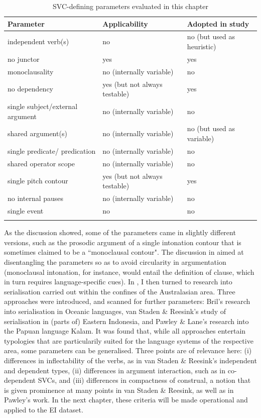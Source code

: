 \begin{table}
    \centering
    \begin{footnotesize}
    \begin{tabular}{l l l}
    \lsptoprule
Parameter & Applicability & Adopted in study \\
\midrule
independent verb(s) & no & no (but used as heuristic) \\
no junctor & yes & yes \\
monoclausality & no (internally variable) & no \\
no dependency & yes (but not always testable) & yes \\
single subject/external argument & no (internally variable) & no \\
shared argument(s) & no (internally variable) & no (but used as variable) \\
single predicate/ predication & no (internally variable) & no \\
shared operator scope & no (internally variable) & no \\
single pitch contour & yes (but not always testable) & yes \\
no internal pauses & no (internally variable) & no \\
single event & no & no \\
\lspbottomrule
    \end{tabular}
    \end{footnotesize}
    \caption{SVC-defining parameters evaluated in this chapter}
    \label{tab:parameters_used}
\end{table}

As the discussion showed, some of the parameters came in slightly different versions, such as the prosodic argument of a single intonation contour that is sometimes claimed to be a ``monoclausal contour". The discussion in  aimed at disentangling the parameters so as to avoid circularity in argumentation (monoclausal intonation, for instance, would entail the definition of clause, which in turn requires language-specific cues). In , I then turned to research into serialisation carried out within the confines of the Australasian area. Three approaches were introduced, and scanned for further parameters: Bril's research into serialisation in Oceanic languages, van Staden \& Reesink's study of serialisation in (parts of) Eastern Indonesia, and Pawley \& Lane's research into the Papuan language Kalam. It was found that, while all approaches entertain typologies that are particularily suited for the language systems of the respective area, some parameters can be generalised. Three points are of relevance here: (i) differences in inflectability of the verbs, as in van Staden \& Reesink's independent and dependent types, (ii) differences in argument interaction, such as in co-dependent SVCs, and (iii) differences in compactness of construal, a notion that is given prominence at many points in van Staden \& Reesink, as well as in Pawley's work. In the next chapter, these criteria will be made operational and applied to the EI dataset.

